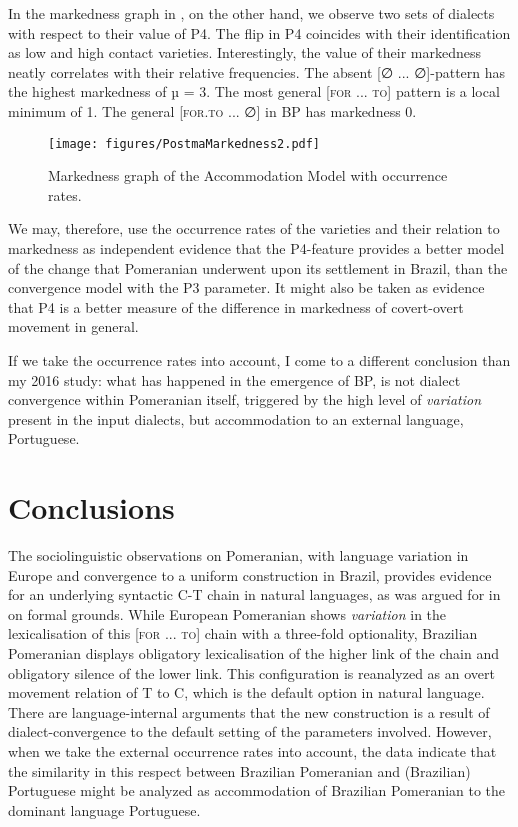\documentclass[output=paper,hidelinks,draftmode]{langscibook}
\begin{document}
In the markedness graph in , on the other hand, we observe two sets of dialects with respect to their value of P4. The flip in P4 coincides with their identification as low and high contact varieties. Interestingly, the value of their markedness neatly correlates with their relative frequencies. The absent [∅ ... ∅]-pattern has the highest markedness of µ = 3. The most general [\textsc{for} ... \textsc{to}] pattern is a local minimum of 1. The general [\textsc{for.to} ... ∅] in BP has markedness 0.


\begin{figure}[t]
\texttt{[image: figures/PostmaMarkedness2.pdf]}
  \caption{
Markedness graph of the Accommodation Model with occurrence rates.
}\label{fig:postma:4}\end{figure}

We may, therefore, use the occurrence rates of the varieties and their relation to markedness as independent evidence that the P4-feature provides a better model of the change that Pomeranian underwent upon its settlement in Brazil, than the convergence model with the P3 parameter. It might also be taken as evidence that P4 is a better measure of the difference in markedness of covert-overt movement in general. 

If we take the occurrence rates into account, I come to a different conclusion than my 2016 study: what has happened in the emergence of BP, is not dialect convergence within Pomeranian itself, triggered by the high level of \textit{variation} present in the input dialects, but accommodation to an external language, Portuguese.

\newpage
\section{Conclusions} %

The sociolinguistic observations on Pomeranian, with language variation in Europe and convergence to a uniform construction in Brazil, provides evidence for an underlying syntactic C-T chain in natural languages, as was argued for in \citet{Pesetsky2007} on formal grounds. While European Pomeranian shows \textit{variation} in the lexicalisation of this
[\textsc{for ... to}] chain with a three-fold optionality, Brazilian Pomeranian displays obligatory lexicalisation of the higher link of the chain and obligatory silence of the lower link. This configuration is reanalyzed as an overt movement relation of T to C, which is the default option in natural language. There are language-internal arguments that the new construction is a result of dialect-convergence to the default setting of the parameters involved. However, when we take the external occurrence rates into account, the data indicate that the similarity in this respect between Brazilian Pomeranian and (Brazilian) Portuguese might be analyzed as accommodation of Brazilian Pomeranian to the dominant language Portuguese.
\end{document}
